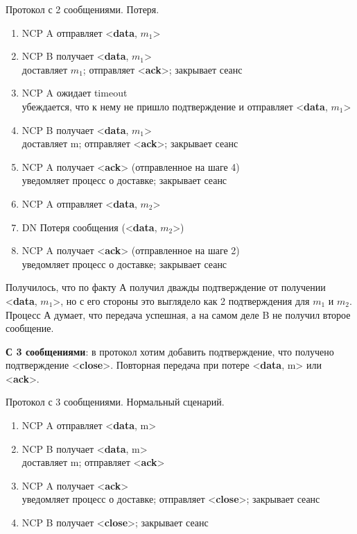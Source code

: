 \begin{algorithm}
	\caption{Протокол с 2 сообщениями. Потеря.}
	\begin{enumerate}
		\item NCP A отправляет <\textbf{data}, $m_1$>
		\item NCP B получает <\textbf{data}, $m_1$> \\
			доставляет $m_1$; отправляет <\textbf{ack}>; закрывает сеанс
		\item NCP A ожидает timeout \\
			убеждается, что к нему не пришло подтверждение и отправляет <\textbf{data},  $m_1$>
		\item NCP B получает <\textbf{data},  $m_1$> \\
			доставляет m; отправляет <\textbf{ack}>; закрывает сеанс
		\item NCP A получает <\textbf{ack}> (отправленное на шаге 4) \\
			уведомляет процесс о доставке; закрывает сеанс
		\item NCP A отправляет <\textbf{data}, $m_2$>
		\item DN Потеря сообщения (<\textbf{data}, $m_2$>)
		\item NCP A получает <\textbf{ack}> (отправленное на шаге 2) \\
			уведомляет процесс о доставке; закрывает сеанс
	\end{enumerate}
\end{algorithm}
Получилось, что по факту А получил дважды подтверждение от получении <\textbf{data}, $m_1$>, но с его стороны это выглядело как 2 подтверждения для $m_1$ и $m_2$. Процесс А думает, что передача успешная, а на самом деле B не получил второе сообщение.

\newpage
\textbf{С 3 сообщениями}: в протокол хотим добавить подтверждение, что получено подтверждение <\textbf{close}>. Повторная передача при потере <\textbf{data}, m> или <\textbf{ack}>.

\begin{algorithm}
	\caption{Протокол с 3 сообщениями. Нормальный сценарий.}
	\begin{enumerate}
		\item NCP A отправляет <\textbf{data}, m>
		\item NCP B получает <\textbf{data}, m> \\
			доставляет m; отправляет <\textbf{ack}>
		\item NCP A получает <\textbf{ack}> \\
			уведомляет процесс о доставке; отправляет <\textbf{close}>; закрывает сеанс
		\item NCP B получает <\textbf{close}>; закрывает сеанс
	\end{enumerate}
\end{algorithm}

